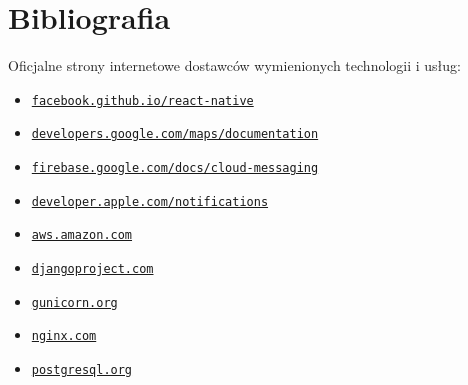 \documentclass[12pt]{article}
\begin{document}
\section*{Bibliografia}
Oficjalne strony internetowe dostawców wymienionych technologii i usług:
\begin{itemize}
\setlength\itemsep{-0.1em}
\item \href{https://facebook.github.io/react-native/}{\texttt{facebook.github.io/react-native}}
\item \href{https://developers.google.com/maps/documentation/}{\texttt{developers.google.com/maps/documentation}}
\item \href{https://firebase.google.com/docs/cloud-messaging/}{\texttt{firebase.google.com/docs/cloud-messaging}}
\item \href{https://developer.apple.com/notifications/}{\texttt{developer.apple.com/notifications}}
\item \href{https://aws.amazon.com/}{\texttt{aws.amazon.com}}
\item \href{https://www.djangoproject.com/}{\texttt{djangoproject.com}}
\item \href{https://gunicorn.org/}{\texttt{gunicorn.org}}
\item \href{https://www.nginx.com/}{\texttt{nginx.com}}
\item \href{https://www.postgresql.org/}{\texttt{postgresql.org}}
\end{itemize}
\end{document}
